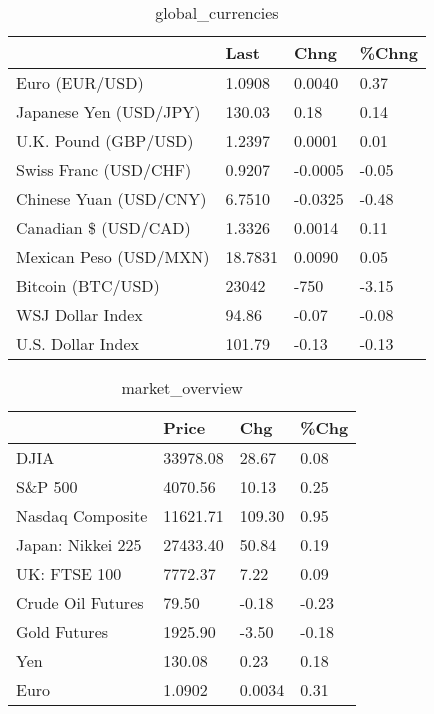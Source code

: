 \documentclass{article}%
\begin{document}
%


\begin{table}[htbp]%
\caption{global\_currencies}%
\centering%
\begin{adjustbox}{width=1\textwidth}%
\begin{tabular}{llll}
\toprule
                       &    Last &    Chng & \%Chng \\
\midrule
        Euro (EUR/USD) &  1.0908 &  0.0040 &  0.37 \\
Japanese Yen (USD/JPY) &  130.03 &    0.18 &  0.14 \\
  U.K. Pound (GBP/USD) &  1.2397 &  0.0001 &  0.01 \\
 Swiss Franc (USD/CHF) &  0.9207 & -0.0005 & -0.05 \\
Chinese Yuan (USD/CNY) &  6.7510 & -0.0325 & -0.48 \\
  Canadian \$ (USD/CAD) &  1.3326 &  0.0014 &  0.11 \\
Mexican Peso (USD/MXN) & 18.7831 &  0.0090 &  0.05 \\
     Bitcoin (BTC/USD) &   23042 &    -750 & -3.15 \\
      WSJ Dollar Index &   94.86 &   -0.07 & -0.08 \\
     U.S. Dollar Index &  101.79 &   -0.13 & -0.13 \\
\bottomrule
\end{tabular}
%
\end{adjustbox}%
\end{table}

%


\begin{table}[htbp]%
\caption{market\_overview}%
\centering%
\begin{adjustbox}{width=1\textwidth}%
\begin{tabular}{llll}
\toprule
                  &    Price &    Chg &  \%Chg \\
\midrule
             DJIA & 33978.08 &  28.67 &  0.08 \\
          S\&P 500 &  4070.56 &  10.13 &  0.25 \\
 Nasdaq Composite & 11621.71 & 109.30 &  0.95 \\
Japan: Nikkei 225 & 27433.40 &  50.84 &  0.19 \\
     UK: FTSE 100 &  7772.37 &   7.22 &  0.09 \\
Crude Oil Futures &    79.50 &  -0.18 & -0.23 \\
     Gold Futures &  1925.90 &  -3.50 & -0.18 \\
              Yen &   130.08 &   0.23 &  0.18 \\
             Euro &   1.0902 & 0.0034 &  0.31 \\
\bottomrule
\end{tabular}
%
\end{adjustbox}%
\end{table}

%
\end{document}
